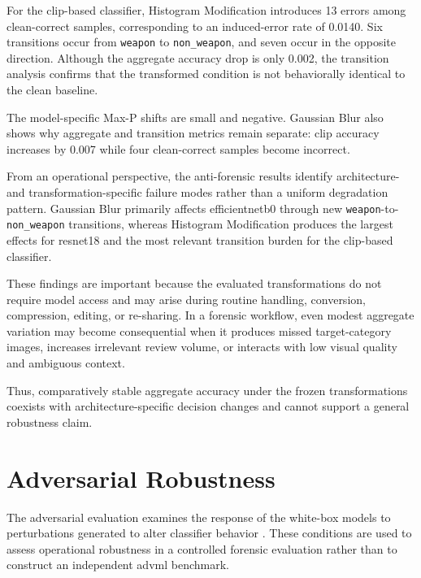 For the \gls{clip}-based classifier, Histogram Modification introduces 13 errors
among clean-correct samples, corresponding to an induced-error rate of 0.0140.
Six transitions occur from \texttt{weapon} to \texttt{non\_weapon}, and seven
occur in the opposite direction. Although the aggregate accuracy drop is only
0.002, the transition analysis confirms that the transformed condition is not
behaviorally identical to the clean baseline.

The model-specific Max-P shifts are small and negative. Gaussian Blur also
shows why aggregate and transition metrics remain separate: \gls{clip} accuracy
increases by 0.007 while four clean-correct samples become incorrect.

From an operational perspective, the anti-forensic results identify
architecture- and transformation-specific failure modes rather than a uniform
degradation pattern. Gaussian Blur primarily affects \gls{efficientnetb0} through
new \texttt{weapon}-to-\texttt{non\_weapon} transitions, whereas Histogram
Modification produces the largest effects for \gls{resnet18} and the most relevant
transition burden for the \gls{clip}-based classifier.

These findings are important because the evaluated transformations do not
require model access and may arise during routine handling, conversion,
compression, editing, or re-sharing. In a forensic workflow, even modest
aggregate variation may become consequential when it produces missed
target-category images, increases irrelevant review volume, or interacts with
low visual quality and ambiguous context.

Thus, comparatively stable aggregate accuracy under the frozen transformations
coexists with architecture-specific decision changes and cannot support a
general robustness claim.

\section{Adversarial Robustness}
\label{sec:results-adversarial}

The adversarial evaluation examines the response of the white-box models to perturbations generated to alter classifier behavior
\cite{szegedy2014intriguing,goodfellow2015explaining,biggio2018wild}. These
conditions are used to assess operational robustness in a controlled forensic
evaluation rather than to construct an independent \gls{advml} benchmark.

